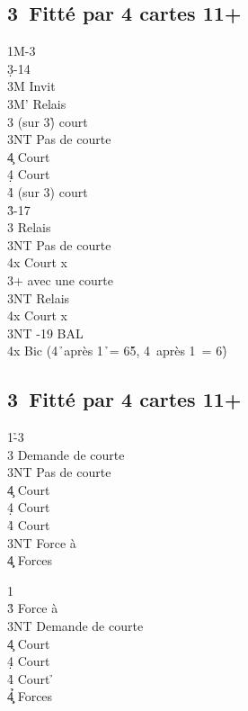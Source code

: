 \documentclass[a4paper]{article}
\begin{document}
\subsection{3\pdfc\ Fitté par 4 cartes 11+}

\begin{bidtable}
1M-3\c\\
3\d {}-14\+\\
3M \> Invit\\
3M' \> Relais\+\\
3\s \> (sur 3\h ) court \h \\
3NT \> Pas de courte\\
4\c \> Court \c \\
4\d \> Court \d \\
4\h \> (sur 3\s ) court \s \-\-\\
3\h {}-17\+\\
3\s \> Relais\+\\
3NT \> Pas de courte\\
4x \> Court x\-\-\\
3\s {}+ avec une courte\+\\
3NT \> Relais\+\\
4x \> Court x\-\-\\
3NT -19 BAL\\
4x \> Bic (4\h\ après 1\h\ = 6\h 5\s , 4\s\ après 1\s\ = 6\h )
\end{bidtable}

\subsection{3\pdfd\ Fitté par 4 cartes 11+}

\begin{bidtable}
1\h-3\d\\
3\s \> Demande de courte\+\\
3NT \> Pas de courte\+\\
4\c \> Court \c \\
4\d \> Court \d \\
4\h \> Court \s \-\-\\
3NT \> Force à \s \\
4\c\d \> Forces
\end{bidtable}

\begin{bidtable}
1\d\\
3\h \> Force à \h \\
3NT \> Demande de courte\+\\
4\c \> Court \c \\
4\d \> Court \d \\
4\h \> Court \h \-\\
4\c\d\h \> Forces
\end{bidtable}
\end{document}
